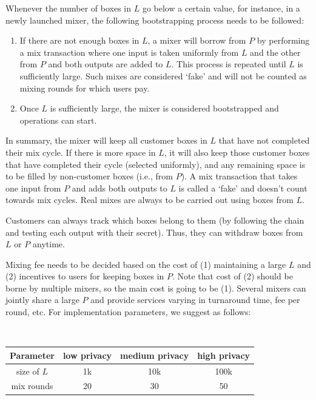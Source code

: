 \documentclass[runningheads]{llncs}
\begin{document}
Whenever the number of boxes in $L$ go below a certain value, for instance, in a newly launched mixer,
the following bootstrapping process needs to be followed:

\begin{enumerate}
\item If there are not enough boxes in $L$, a mixer will borrow from $P$ by performing a mix transaction where
one input is taken uniformly from $L$ and the other from $P$ and both outputs are added to $L$.
This process is repeated until $L$ is sufficiently large. Such mixes are considered `fake' and
will not be counted as mixing rounds for which users pay.

\item Once $L$ is sufficiently large, the mixer is considered bootstrapped and operations can start.
\end{enumerate}

In summary, the mixer will keep all customer boxes in $L$ that have not completed their mix cycle.
If there is more space in $L$, it will also keep those customer boxes that have completed their cycle (selected uniformly),
and any remaining space is to be filled by non-customer boxes (i.e., from $P$). A mix transaction that takes one input from $P$
and adds both outputs to $L$ is called a `fake' and doesn't count towards mix cycles. Real mixes are always to be carried out using boxes from $L$.

Customers can always track which boxes belong to them (by following the chain and testing each output with their secret).
Thus, they can withdraw boxes from $L$ or $P$  anytime.

Mixing fee needs to be decided based on the cost of (1) maintaining a large $L$ and (2) incentives to users for keeping boxes in $P$.
Note that cost of (2) should be borne by multiple mixers, so the main cost is going to be (1).
Several mixers can jointly share a large $P$ and provide services varying in turnaround time, fee per round, etc.
For implementation parameters, we suggest as follows:

~\\

\begin{tabular}
{|c|c|c|c|}\hline
Parameter & low privacy & medium privacy & high privacy  \\\hline
size of $L$ & 1k & 10k & 100k \\
mix rounds & 20 & 30 & 50 \\\hline
\end{tabular}
\end{document}
